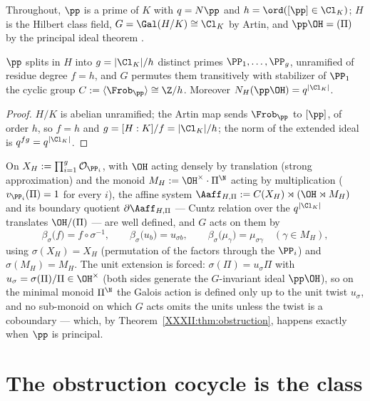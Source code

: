 Throughout, $\pp$ is a prime of $K$ with $q=\Ns\pp$ and $h=\ord([\pp]\in\Cl_K)$; $H$ is
the Hilbert class field, $G=\Gal(H/K)\cong\Cl_K$ by Artin, and $\pp\OH=(\Pi)$ by the
principal ideal theorem \cite[VI.7]{Neukirch}.

\begin{lemma}\label{XXXII:lem:split}
$\pp$ splits in $H$ into $g=|\Cl_K|/h$ distinct primes $\PP_1,\dots,\PP_g$, unramified of
residue degree $f=h$, and $G$ permutes them transitively with stabilizer of $\PP_1$ the
cyclic group $C:=\langle\Frob_\pp\rangle\cong\Z/h$. Moreover $\Ns_H(\pp\OH)=q^{|\Cl_K|}$.
\end{lemma}

\begin{proof}
$H/K$ is abelian unramified; the Artin map sends $\Frob_\pp$ to $[\pp]$, of order $h$, so
$f=h$ and $g=[H:K]/f=|\Cl_K|/h$; the norm of the extended ideal is $q^{fg}=q^{|\Cl_K|}$.
\end{proof}

\begin{proposition}\label{XXXII:prop:top}
On $X_H:=\prod_{i=1}^g\mathcal O_{\PP_i}$, with $\OH$ acting densely by translation
(strong approximation) and the monoid $M_H:=\OH^\times\cdot\Pi^{\N}$ acting by
multiplication ($v_{\PP_i}(\Pi)=1$ for every $i$), the affine system
$\Aaff_{H,\Pi}:=C(X_H)\rtimes(\OH\rtimes M_H)$ and its boundary quotient
$\partial\Aaff_{H,\Pi}$ --- Cuntz relation over the $q^{|\Cl_K|}$ translates
$\OH/(\Pi)$ --- are well defined, and $G$ acts on them by
\[
\beta_\sigma\bigl(f\bigr)=f\circ\sigma^{-1},\qquad
\beta_\sigma\bigl(u_b\bigr)=u_{\sigma b},\qquad
\beta_\sigma\bigl(\mu_\gamma\bigr)=\mu_{\sigma\gamma}\quad(\gamma\in M_H),
\]
using $\sigma(X_H)=X_H$ (permutation of the factors through the $\PP_i$) and
$\sigma(M_H)=M_H$. The unit extension is forced: $\sigma(\Pi)=u_\sigma\Pi$ with
$u_\sigma=\sigma(\Pi)/\Pi\in\OH^\times$ (both sides generate the $G$-invariant ideal
$\pp\OH$), so on the minimal monoid $\Pi^{\N}$ the Galois action is defined only up to the
unit twist $u_\sigma$, and no sub-monoid on which $G$ acts omits the units unless the
twist is a coboundary --- which, by Theorem~\ref{XXXII:thm:obstruction}, happens exactly when
$\pp$ is principal.
\end{proposition}

\section{The obstruction cocycle is the class}\label{XXXII:sec:obstruction}

